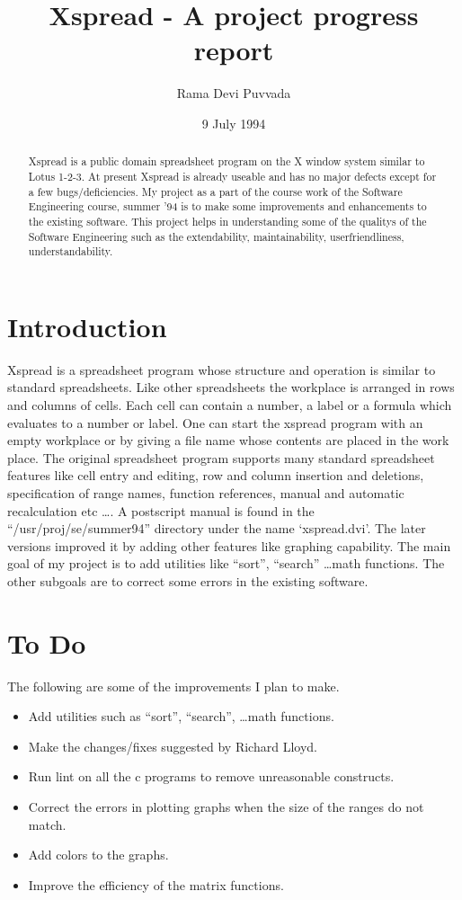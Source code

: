 \title{\bf Xspread - A project progress report}
\author{Rama Devi Puvvada}
\date{9 July 1994}


\maketitle
\begin {abstract}
Xspread is a public domain spreadsheet program on the X window system similar 
to Lotus 1-2-3. At present Xspread is already useable and has no major defects 
except for a few bugs/deficiencies. My project as a part of the course work of 
the Software Engineering course, summer '94 is to make some improvements and 
enhancements to the existing software. This project helps in understanding 
some of the qualitys of the Software Engineering such as the extendability, 
maintainability, userfriendliness, understandability.
\end{abstract}

\section{Introduction}

Xspread is a spreadsheet program whose structure and operation is similar to standard spreadsheets. 
Like other spreadsheets the workplace is arranged in rows and columns of cells. 
Each cell can contain a number, a label or a formula which evaluates to a number or label. 
One can start the xspread program with an empty workplace or by giving a file name whose contents are placed in the work place. 
The original spreadsheet program supports many standard spreadsheet features like cell entry and editing, row and column insertion and deletions, specification of range names, function references, manual and automatic recalculation etc \ldots. 
A postscript manual is found in the ``/usr/proj/se/summer94'' directory under the name `xspread.dvi'. 
The later versions improved it by adding other features like graphing capability. 
The main goal of my project is to add utilities like ``sort'', ``search'' \ldots math functions. 
The other subgoals are to correct some errors in the existing software.

\section{To Do}
The following are some of the improvements I plan to make.
    \begin{itemize}
     \item Add utilities such as ``sort'', ``search'', \ldots math functions.
     \item Make the changes/fixes suggested by Richard Lloyd.
     \item Run lint on all the c programs to remove unreasonable constructs.
     \item Correct the errors in plotting graphs when the size of the ranges 
do not match.
     \item Add colors to the graphs.
     \item Improve the efficiency of the matrix functions. 
    \end{itemize}

